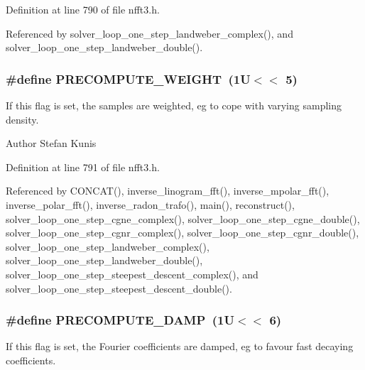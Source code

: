Definition at line 790 of file nfft3.\-h.



Referenced by solver\-\_\-loop\-\_\-one\-\_\-step\-\_\-landweber\-\_\-complex(), and solver\-\_\-loop\-\_\-one\-\_\-step\-\_\-landweber\-\_\-double().

\hypertarget{group__solver_gaa59267dba2cd3247c5ee4eb493d31c2d}{
\subsubsection[{P\-R\-E\-C\-O\-M\-P\-U\-T\-E\-\_\-\-W\-E\-I\-G\-H\-T}]{\setlength{\rightskip}{0pt plus 5cm}\#define P\-R\-E\-C\-O\-M\-P\-U\-T\-E\-\_\-\-W\-E\-I\-G\-H\-T~(1\-U$<$$<$ 5)}}\label{group__solver_gaa59267dba2cd3247c5ee4eb493d31c2d}
If this flag is set, the samples are weighted, eg to cope with varying sampling density.

\begin{DoxyAuthor}{Author}
Stefan Kunis 
\end{DoxyAuthor}


Definition at line 791 of file nfft3.\-h.



Referenced by C\-O\-N\-C\-A\-T(), inverse\-\_\-linogram\-\_\-fft(), inverse\-\_\-mpolar\-\_\-fft(), inverse\-\_\-polar\-\_\-fft(), inverse\-\_\-radon\-\_\-trafo(), main(), reconstruct(), solver\-\_\-loop\-\_\-one\-\_\-step\-\_\-cgne\-\_\-complex(), solver\-\_\-loop\-\_\-one\-\_\-step\-\_\-cgne\-\_\-double(), solver\-\_\-loop\-\_\-one\-\_\-step\-\_\-cgnr\-\_\-complex(), solver\-\_\-loop\-\_\-one\-\_\-step\-\_\-cgnr\-\_\-double(), solver\-\_\-loop\-\_\-one\-\_\-step\-\_\-landweber\-\_\-complex(), solver\-\_\-loop\-\_\-one\-\_\-step\-\_\-landweber\-\_\-double(), solver\-\_\-loop\-\_\-one\-\_\-step\-\_\-steepest\-\_\-descent\-\_\-complex(), and solver\-\_\-loop\-\_\-one\-\_\-step\-\_\-steepest\-\_\-descent\-\_\-double().

\hypertarget{group__solver_ga9ccacd28b2d441a797a5c0d9e6c17fa7}{
\subsubsection[{P\-R\-E\-C\-O\-M\-P\-U\-T\-E\-\_\-\-D\-A\-M\-P}]{\setlength{\rightskip}{0pt plus 5cm}\#define P\-R\-E\-C\-O\-M\-P\-U\-T\-E\-\_\-\-D\-A\-M\-P~(1\-U$<$$<$ 6)}}\label{group__solver_ga9ccacd28b2d441a797a5c0d9e6c17fa7}
If this flag is set, the Fourier coefficients are damped, eg to favour fast decaying coefficients.


